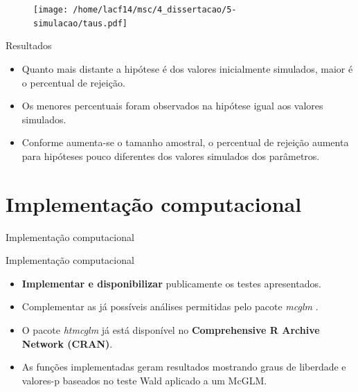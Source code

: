 \documentclass[
  ignorenonframetext,
  serif,
  professionalfont,
  usenames,
  dvipsnames,
  aspectratio = 169]{beamer}
\begin{document}
\begin{frame}{}
\protect\hypertarget{section-1}{}
\begin{figure}[H]
\centering
\texttt{[image: /home/lacf14/msc/4\_dissertacao/5-simulacao/taus.pdf]}
\end{figure}
\end{frame}

\begin{frame}{Resultados}
\protect\hypertarget{resultados}{}
\begin{itemize}
  \itemsep 2ex
  
  \item Quanto mais distante a hipótese é dos valores inicialmente simulados, maior é o percentual de rejeição. 
  
  \item Os menores percentuais foram observados na hipótese igual aos valores simulados. 

  \item Conforme aumenta-se o tamanho amostral, o percentual de rejeição aumenta para hipóteses pouco diferentes dos valores simulados dos parâmetros.

\end{itemize}
\end{frame}

\hypertarget{implementauxe7uxe3o-computacional}{%
\section{Implementação
computacional}\label{implementauxe7uxe3o-computacional}}

\begin{frame}{Implementação computacional}
\end{frame}

\begin{frame}{Implementação computacional}
\protect\hypertarget{implementauxe7uxe3o-computacional-1}{}
\begin{itemize}
  \itemsep 2ex
  
  \item \textbf{Implementar e disponibilizar} publicamente os testes apresentados.

  \item Complementar as já possíveis análises permitidas pelo pacote \emph{mcglm} \citep{mcglm}.

  \item O pacote \emph{htmcglm} já está disponível no \textbf{Comprehensive R Archive Network (CRAN)}.

  \item As funções implementadas geram resultados mostrando graus de liberdade e valores-p baseados no teste Wald aplicado a um McGLM.
\end{itemize}
\end{frame}
\end{document}
